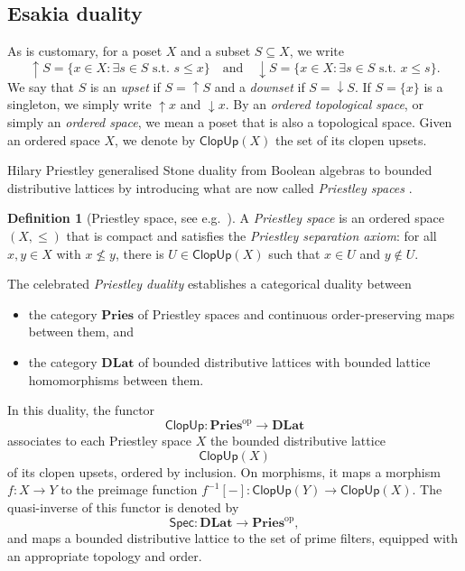 \documentclass[12pt]{amsart}
\theoremstyle{plain}
\theoremstyle{definition}
\newtheorem{definition}[theorem]{Definition}
\newcommand{\cat}[1]{\mathbf{#1}}
\newcommand{\op}{\mathrm{op}}
\newcommand{\DLat}{\cat{DLat}}
\newcommand{\Pries}{\cat{Pries}}
\newcommand{\Spec}{\mathsf{Spec}}
\newcommand{\ClopUp}{\mathsf{ClopUp}}
\renewcommand{\u}{{\uparrow}}
\renewcommand{\d}{{\downarrow}}
\begin{document}
\subsection{Esakia duality}

As is customary, for a poset $X$ and a subset $S\subseteq X$, we write 
\[
    {\u}S=\{x\in X : \exists s\in S \text{ s.t.\ } s\leq x\} \quad \text{and} \quad {\d}S=\{x\in X : \exists s\in S \text{ s.t.\ } x\leq s\}.
\]
We say that $S$ is an \emph{upset} if $S={\u}S$ and a \emph{downset} if $S={\d}S$. 
If $S = \{ x \}$ is a singleton, we simply write ${\u}x$ and ${\d}x$.
By an \emph{ordered topological space}, or simply an \emph{ordered space}, we mean a poset that is also a topological space. 
Given an ordered space $X$, we denote by $\ClopUp(X)$ the set of its clopen upsets.

Hilary Priestley generalised Stone duality from Boolean algebras to bounded distributive lattices by introducing what are now called \emph{Priestley spaces} \cite{Priestley1970}.

\begin{definition}[Priestley space, see e.g.\ {\cite[p.~258]{Davey2002-lr}}]
    A \emph{Priestley space} is an ordered space $(X,\leq)$ that is compact and satisfies the \emph{Priestley separation axiom}: for all $x,y \in X$ with $x\nleq y$, there is $U\in \ClopUp(X)$ such that $x\in U$ and $y\notin U$. 
\end{definition}


The celebrated \emph{Priestley duality} \cite{Priestley1970} establishes a categorical duality between
\begin{itemize}
    \item the category $\Pries$ of Priestley spaces and continuous order-preserving maps between them, and
    \item the category $\DLat$ of bounded distributive lattices with bounded lattice homomorphisms between them.
\end{itemize}
In this duality, 
the functor
\[
\ClopUp \colon \Pries^\op \to \DLat
\]
associates to each Priestley space $X$ the bounded distributive lattice 
\[
\ClopUp(X)
\]
of its clopen upsets, ordered by inclusion.
On morphisms, it maps a morphism $f \colon X \to Y$ to the preimage function $f^{-1}[-]\colon \ClopUp(Y) \to \ClopUp(X)$.
The quasi-inverse of this functor is denoted by
\[
\Spec \colon \DLat \longrightarrow \Pries^{\op},
\]
and maps a bounded distributive lattice to the set of prime filters, equipped with an appropriate topology and order.
\end{document}
